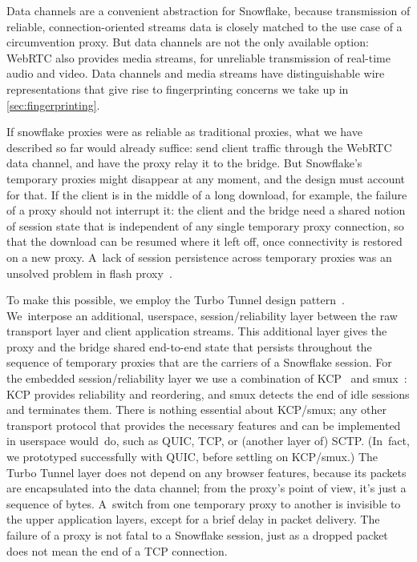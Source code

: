 \documentclass[letterpaper,twocolumn]{article}
\begin{document}
Data channels are a convenient abstraction for Snowflake,
because transmission of reliable,
connection-oriented streams data is closely matched
to the use case of a circumvention proxy.
But data channels are not the only available option:
WebRTC also provides media streams,
for unreliable transmission of real-time audio and video.
Data channels and media streams have distinguishable wire representations
that give rise to fingerprinting concerns we take up in \autoref{sec:fingerprinting}.

If snowflake proxies were as reliable as traditional proxies,
what we have described so far would already suffice:
send client traffic through the WebRTC data channel,
and have the proxy relay it to the bridge.
But Snowflake's temporary proxies might
disappear at any moment,
and the design must account for that.
If the client is in the middle of a long download,
for example, the failure of a proxy should not interrupt it:
the client and the bridge need a shared notion of session state
that is independent of any single temporary proxy connection,
so that the download can be resumed where it left off,
once connectivity is restored on a new proxy.
A~lack of session persistence across temporary proxies
was an unsolved problem in flash proxy~\cite[\S 5.2]{Fifield2012a}.

To make this possible, we employ the
Turbo Tunnel design pattern~\cite{Fifield2020a}.
We~interpose an additional, userspace,
session/reliability layer between the raw transport layer
and client application streams.
This additional layer gives the proxy and the bridge
shared end-to-end state that persists throughout
the sequence of temporary proxies that are the carriers of a Snowflake session.
For the embedded session/reliability layer
we use a combination of
KCP~\cite{kcp} and
smux~\cite{smux}:
KCP provides reliability and reordering,
and smux detects the end of idle sessions and terminates them.
There is nothing essential about KCP/smux;
any other transport protocol that provides the necessary features
and can be implemented in userspace would~do,
such as QUIC, TCP, or (another layer of) SCTP.
(In~fact, we prototyped successfully with QUIC, before settling on KCP/smux.)
The Turbo Tunnel layer does not depend on any browser features,
because its packets are encapsulated into the data channel;
from the proxy's point of view, it's just a sequence of bytes.
A~switch from one temporary proxy to another
is invisible to the upper application layers,
except for a brief delay in packet delivery.
The failure of a proxy
is not fatal to a Snowflake session,
just as a dropped packet does not mean the end of a TCP connection.
\end{document}
